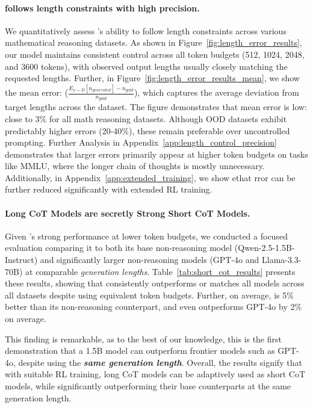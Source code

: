 \paragraph{\model{} follows length constraints with high precision.}
\label{sec:length_control_precision}


We quantitatively assess \model{}'s ability to follow length constraints across various mathematical reasoning datasets. As shown in Figure~\ref{fig:length_error_results}, our model maintains consistent control across all token budgets (512, 1024, 2048, and 3600 tokens), with observed output lengths usually closely matching the requested lengths.
Further, in Figure~\ref{fig:length_error_results_mean}, we show the mean error: ($\frac{E_{x \sim D}[n_{generated}] - n_{gold}}{n_{gold}}$), which captures the average deviation from target lengths across the dataset. The figure demonstrates that mean error is low: close to 3\% for all math reasoning datasets.
Although OOD datasets exhibit predictably higher errors (20-40\%), these remain preferable over uncontrolled prompting. 
Further Analysis in Appendix~\ref{app:length_control_precision} demonstrates that larger errors primarily appear at higher token budgets on tasks like MMLU, where the longer chain of thoughts is mostly unnecessary. Additionally, in Appendix~\ref{app:extended_training}, we show ethat rror can be further reduced significantly with extended RL training.

\paragraph{Long CoT Models are secretly Strong Short CoT Models.}



Given \model{}'s strong performance at lower token budgets, we conducted a focused evaluation comparing it to both its base non-reasoning model (Qwen-2.5-1.5B-Instruct) and significantly larger non-reasoning models (GPT-4o and Llama-3.3-70B) at comparable \textit{generation lengths}. Table~\ref{tab:short_cot_results} presents these results, showing that \model{} consistently outperforms or matches all models across all datasets despite using equivalent token budgets. Further, on average, \model{} is 5\% better than its non-reasoning counterpart, and even outperforms GPT-4o by 2\% on average.

This finding is remarkable, as to the best of our knowledge, this is the first demonstration that a 1.5B model can outperform frontier models such as GPT-4o, despite using the \textit{\textbf{same generation length}}.  
Overall, the results signify that with suitable RL training, long CoT models can be adaptively used as short CoT models, while significantly outperforming their base counterparts at the same generation length.

